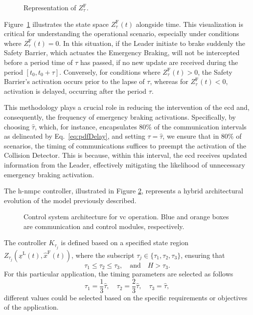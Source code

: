 \begin{figure}[H]
	\resizebox{\linewidth}{!}{}
	\caption{Representation of $Z_{\tau}^\mathrm{F}$.}
	\label{fig:Z_tau}
\end{figure}
Figure~\ref{fig:Z_tau} illustrates the state space \(Z_{\tau}^{\mathrm{F}}(t)\) alongside time. This visualization is critical for understanding the operational scenario, especially under conditions where \(Z_{\tau}^{\mathrm{F}}(t)=0\). In this situation, if the Leader initiate to brake suddenly the Safety Barrier, which actuates the Emergency Braking, will not be intercepted before a period time of $\tau$ has passed, if no new update are received during the period $\left[t_0, t_0+\tau\right]$. Conversely, for conditions where \(Z_{\tau}^{\mathrm{F}}(t)>0\), the Safety Barrier's activation occurs prior to the lapse of $\tau$, whereas for \(Z_{\tau}^{\mathrm{F}}(t)<0\), activation is delayed, occurring after the period $\tau$.

This methodology plays a crucial role in reducing the intervention of the \gls{ecd} and, consequently, the frequency of emergency braking activations. Specifically, by choosing \(\hat{\tau}\), which, for instance, encapsulates 80\% of the communication intervals as delineated by Eq.~\eqref{eq:pdfDelay}, and setting \(\tau = \hat{\tau}\), we ensure that in 80\% of scenarios, the timing of communications suffices to preempt the activation of the Collision Detector. This is because, within this interval, the \gls{ecd} receives updated information from the Leader, effectively mitigating the likelihood of unnecessary emergency braking activation.

The \gls{h-nmpc} controller, illustrated in Figure \ref{fig:h-nmpc}, represents a hybrid architectural evolution of the model previously described. 
%
\begin{figure}[H]
	\resizebox{\linewidth}{!}{}
	\caption{Control system architecture for \gls{vc} operation. Blue and orange boxes are communication and control modules, respectively. }
	\label{fig:h-nmpc}
\end{figure}
%
The controller $K_{\tau_j}$ is defined based on a specified state region $Z_{\tau_j}\left(\underline{x}^\mathrm{L}(t),\hat{x}^\mathrm{F}(t)\right)$, where the subscript $\tau_j \in \{\tau_1,\tau_2,\tau_3\}$, ensuring that
\begin{equation*}
	\tau_1 \leq \tau_2 \leq \tau_3, \quad \text{and} \quad H>\tau_3.
\end{equation*}
For this particular application, the timing parameters are selected as follows
\begin{equation*}
	\tau_1 = \frac{1}{3}\hat{\tau}, \quad
	\tau_2 = \frac{2}{3}\hat{\tau}, \quad
	\tau_3 = \hat{\tau},
\end{equation*}
different values could be selected based on the specific requirements or objectives of the application.

